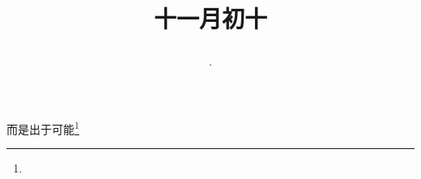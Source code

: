 \title{\date[d=10,m=12,y=2024][year:cn-y,年,month:cn,day:cn,日,·,weekday]·十一月初十 }
而是出于可能\footnote{ }

